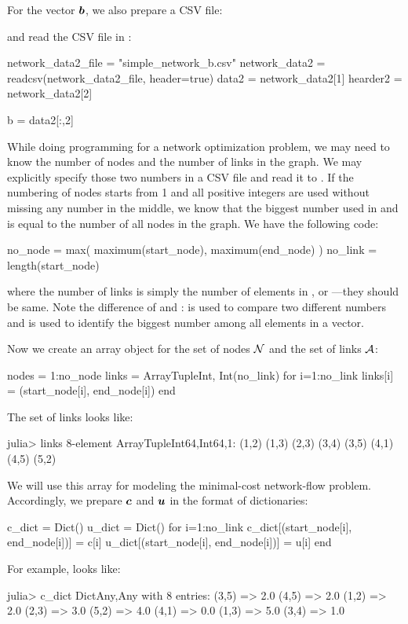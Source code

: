 For the vector $\boldsymbol{b}$, we also prepare a CSV file:


\noindent and read the CSV file in \julia{}:
\begin{code}
network_data2_file = "simple_network_b.csv"
network_data2 = readcsv(network_data2_file,  header=true)
data2 = network_data2[1]
hearder2 = network_data2[2]

b = data2[:,2]
\end{code}

While doing \julia{} programming for a network optimization problem, we may need to know the number of nodes and the number of links in the graph. We may explicitly specify those two numbers in a CSV file and read it to \julia{}. If the numbering of nodes starts from 1 and all positive integers are used without missing any number in the middle, we know that the biggest number used in  and  is equal to the number of all nodes in the graph. We have the following code:
\begin{code}
no_node = max( maximum(start_node), maximum(end_node) )
no_link = length(start_node)
\end{code}
\noindent where the number of links is simply the number of elements in , or ---they should be same. Note the difference of  and :  is used to compare two different numbers and  is used to identify the biggest number among all elements in a vector.

Now we create an array object for the set of nodes $\mathcal{N}$ and the set of links $\mathcal{A}$:
\begin{code}
nodes = 1:no_node
links = Array{Tuple{Int, Int}}(no_link)
for i=1:no_link
   	links[i] = (start_node[i], end_node[i])
end
\end{code}
The set of links looks like:
\begin{code}
julia> links
8-element Array{Tuple{Int64,Int64},1}:
 (1,2)
 (1,3)
 (2,3)
 (3,4)
 (3,5)
 (4,1)
 (4,5)
 (5,2)
\end{code}

We will use this array  for modeling the minimal-cost network-flow problem. Accordingly, we prepare $\boldsymbol{c}$ and $\boldsymbol{u}$ in the format of dictionaries:
\begin{code}
c_dict = Dict()
u_dict = Dict()
for i=1:no_link
    c_dict[(start_node[i], end_node[i])] = c[i]
    u_dict[(start_node[i], end_node[i])] = u[i]
end
\end{code}
\noindent For example,  looks like:
\begin{code}
julia> c_dict
Dict{Any,Any} with 8 entries:
  (3,5) => 2.0
  (4,5) => 2.0
  (1,2) => 2.0
  (2,3) => 3.0
  (5,2) => 4.0
  (4,1) => 0.0
  (1,3) => 5.0
  (3,4) => 1.0
\end{code}



